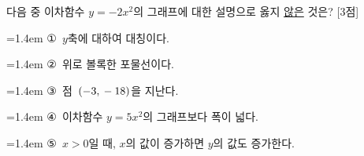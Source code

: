 다음 중 이차함수 $y=-2x^2$의 그래프에 대한 설명으로 옳지 \underline{않은} 것은? \mbox{[3점]}
\par\medskip\par\noindent\hangindent=1.4em {\small ①}\ $y$축에 대하여 대칭이다.\par\noindent\hangindent=1.4em {\small ②}\ 위로 볼록한 포물선이다.\par\noindent\hangindent=1.4em {\small ③}\ 점~$(-3{,}\mkern3mu -18)$을 지난다.\par\noindent\hangindent=1.4em {\small ④}\ 이차함수 $y=5x^2$의 그래프보다 폭이 넓다.\par\noindent\hangindent=1.4em {\small ⑤}\ $x>0$일 때, $x$의 값이 증가하면 $y$의 값도 증가한다.\par\medskip
